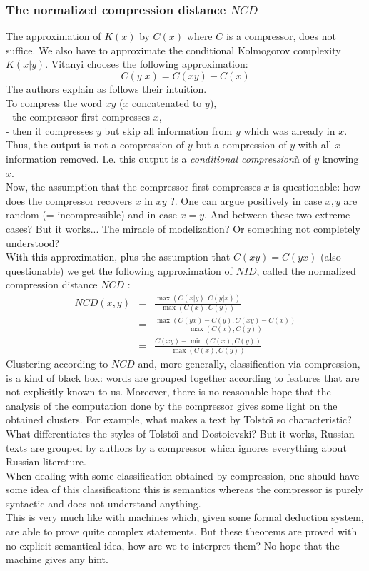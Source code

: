 \subsubsection{The normalized compression distance $NCD$}
The approximation of $K(x)$ by $C(x)$ where $C$ is a compressor,
does not suffice. We also have to approximate the conditional
Kolmogorov complexity $K(x|y)$.
Vitanyi chooses the following approximation:
$$
C(y|x) = C(xy) - C(x)
$$
The authors explain as follows their intuition.
\\ To compress the word $xy$ ($x$ concatenated to $y$),
\\- the compressor first compresses $x$,
\\- then it compresses $y$ but skip all information from $y$
which was already in $x$.
\\ Thus, the output is not a compression of $y$ but a compression
of $y$ with all $x$ information removed.
I.e. this output is a {\em conditional compression}ñ of $y$ knowing $x$.
\\
Now, the assumption that the compressor first compresses $x$
is questionable: how does the compressor recovers $x$ in $xy$ ?.
One can argue positively in case $x,y$ are random
(= incompressible) and in case $x=y$.
And between these two extreme cases? But it works...
The miracle of modelization?
Or something not completely understood?
\medskip\\
With this approximation, plus the assumption that
$C(xy)=C(yx)$ (also questionable) we get the following approximation
of $NID$, called the normalized compression distance $NCD$ :
\begin{eqnarray*}
NCD(x,y) &=& \frac{\max(C(x|y),C(y|x))}{\max(C(x),C(y))}\\
&=& \frac{\max(C(yx)-C(y),C(xy)-C(x))}{\max(C(x),C(y))}\\
&=& \frac{C(xy)-\min(C(x),C(y))}{\max(C(x),C(y))}
\end{eqnarray*}
Clustering according to $NCD$ and, more generally, classification
via compression, is a kind of black box: words are grouped
together according to features that are not explicitly known to us.
Moreover, there is no reasonable hope that the analysis of the
computation done by the compressor gives some light on the obtained
clusters.
For example, what makes a text by Tolsto\"{\i} so characteristic?
What differentiates the styles of Tolsto\"{\i} and Dostoievski?
But it works, Russian texts are grouped by authors by a compressor
which ignores everything about Russian literature.
\\
When dealing with some classification obtained by compression,
one should have some idea of this classification:
this is semantics whereas the compressor is purely syntactic
and does not understand anything.
\\
This is very much like with machines which, given some formal
deduction system, are able to prove quite complex statements.
But these theorems are proved with no explicit semantical idea,
how are we to interpret them? No hope that the machine gives
any hint.
